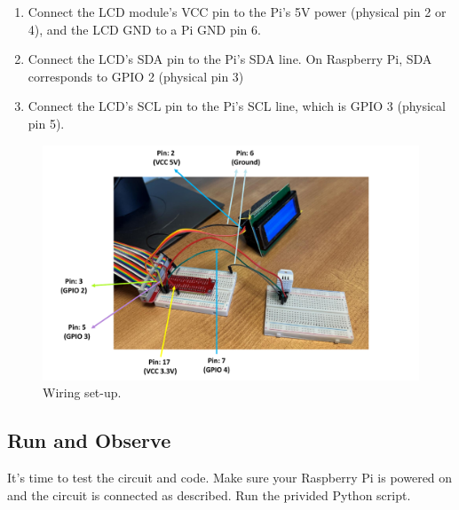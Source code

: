 \documentclass[a4paper,11pt]{article}
\begin{document}
\begin{enumerate}
    \item Connect the LCD module's VCC pin to the Pi's 5V power (physical pin 2 or 4), 
    and the LCD GND to a Pi GND pin 6.

    \item Connect the LCD’s SDA pin to the Pi’s SDA line. On Raspberry Pi, SDA corresponds to GPIO 2 (physical pin 3)

    \item Connect the LCD's SCL pin to the Pi's SCL line, which is GPIO 3 (physical pin 5).

\end{enumerate}

\begin{figure}[h] %
    \centering
    \includegraphics[width=.85\textwidth]{fig2.pdf} %
    \caption{Wiring set-up.}
    \label{fig:runtime1}
\end{figure}

\newpage
\subsection*{Run and Observe}
It’s time to test the circuit and code. Make sure your 
Raspberry Pi is powered on and the circuit is connected as described. 
Run the privided Python script.
\end{document}
